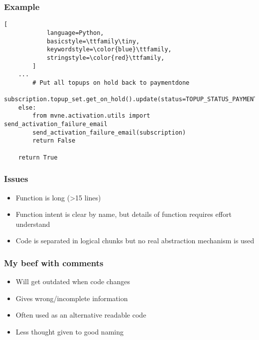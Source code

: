 \begin{frame}[fragile]
\frametitle{Example}
	\begin{block}{}
        \begin{lstlisting}[
            language=Python,
            basicstyle=\ttfamily\tiny,
            keywordstyle=\color{blue}\ttfamily,
            stringstyle=\color{red}\ttfamily,
        ]
    ...
        # Put all topups on hold back to paymentdone
        subscription.topup_set.get_on_hold().update(status=TOPUP_STATUS_PAYMENT_DONE)
    else:
        from mvne.activation.utils import send_activation_failure_email
        send_activation_failure_email(subscription)
        return False

    return True
        \end{lstlisting}
	\end{block}
\end{frame}

\begin{frame}
    \frametitle{Issues}
    \begin{block}{}
        \begin{itemize}
            \item Function is long (\textgreater 15 lines)
            \item Function intent is clear by name, but details of function requires effort understand
            \item Code is separated in logical chunks but no real abstraction mechanism is used
        \end{itemize}
    \end{block}

\end{frame}

\begin{frame}
    \frametitle{My beef with comments}
    \begin{block}{}
        \begin{itemize}
            \item Will get outdated when code changes
            \item Gives wrong/incomplete information
            \item Often used as an alternative readable code
            \item Less thought given to good naming
        \end{itemize}
    \end{block}
\end{frame}

